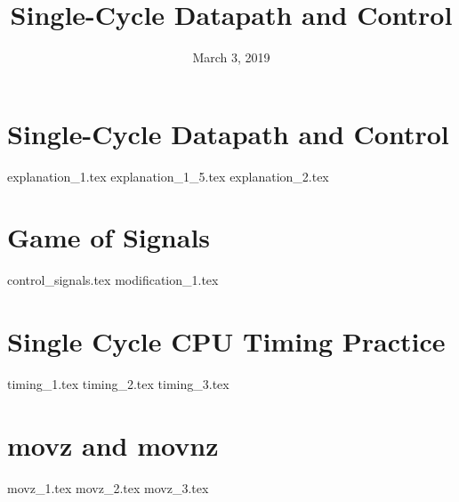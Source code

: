 \documentclass[11pt]{exam}
\title{Single-Cycle Datapath and Control}
\date{March 3, 2019}
\begin{document}
\maketitle

\section{Single-Cycle Datapath and Control}
\begin{questions}
{explanation_1.tex}
{explanation_1_5.tex}
{explanation_2.tex}
\end{questions}
\newpage

\section{Game of Signals}
\begin{questions}
{control_signals.tex}
{modification_1.tex}
\end{questions}
\newpage

\section{Single Cycle CPU Timing Practice}
\begin{questions}
{timing_1.tex}
{timing_2.tex}
{timing_3.tex}
\end{questions}
\newpage

\section{movz and movnz}
\begin{questions}
{movz_1.tex}
{movz_2.tex}
{movz_3.tex}
\end{questions}
\newpage
\end{document}
